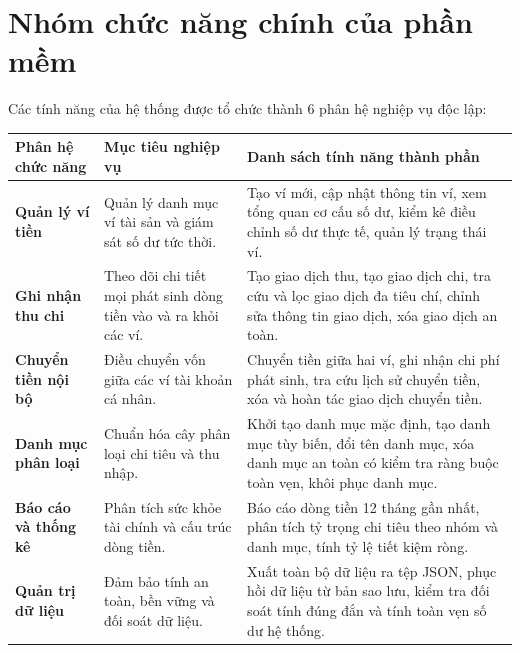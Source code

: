 \documentclass[a4paper,12pt]{report}
\newcounter{none}
\begin{document}
\section{Nhóm chức năng chính của phần
mềm}\label{nhuxf3m-chux1ee9c-nux103ng-chuxednh-cux1ee7a-phux1ea7n-mux1ec1m}

Các tính năng của hệ thống được tổ chức thành 6 phân hệ nghiệp vụ độc
lập:

{\def\LTcaptype{none} %
\begin{longtable}[]{@{}
  >{\raggedright\arraybackslash}p{}
  >{\raggedright\arraybackslash}p{}
  >{\raggedright\arraybackslash}p{}@{}}
\toprule\noalign{}
\begin{minipage}[b]{\linewidth}\raggedright
Phân hệ chức năng
\end{minipage} & \begin{minipage}[b]{\linewidth}\raggedright
Mục tiêu nghiệp vụ
\end{minipage} & \begin{minipage}[b]{\linewidth}\raggedright
Danh sách tính năng thành phần
\end{minipage} \\
\midrule\noalign{}
\endhead
\bottomrule\noalign{}
\endlastfoot
\textbf{Quản lý ví tiền} & Quản lý danh mục ví tài sản và giám sát số dư
tức thời. & Tạo ví mới, cập nhật thông tin ví, xem tổng quan cơ cấu số
dư, kiểm kê điều chỉnh số dư thực tế, quản lý trạng thái ví. \\
\textbf{Ghi nhận thu chi} & Theo dõi chi tiết mọi phát sinh dòng tiền
vào và ra khỏi các ví. & Tạo giao dịch thu, tạo giao dịch chi, tra cứu
và lọc giao dịch đa tiêu chí, chỉnh sửa thông tin giao dịch, xóa giao
dịch an toàn. \\
\textbf{Chuyển tiền nội bộ} & Điều chuyển vốn giữa các ví tài khoản cá
nhân. & Chuyển tiền giữa hai ví, ghi nhận chi phí phát sinh, tra cứu
lịch sử chuyển tiền, xóa và hoàn tác giao dịch chuyển tiền. \\
\textbf{Danh mục phân loại} & Chuẩn hóa cây phân loại chi tiêu và thu
nhập. & Khởi tạo danh mục mặc định, tạo danh mục tùy biến, đổi tên danh
mục, xóa danh mục an toàn có kiểm tra ràng buộc toàn vẹn, khôi phục danh
mục. \\
\textbf{Báo cáo và thống kê} & Phân tích sức khỏe tài chính và cấu trúc
dòng tiền. & Báo cáo dòng tiền 12 tháng gần nhất, phân tích tỷ trọng chi
tiêu theo nhóm và danh mục, tính tỷ lệ tiết kiệm ròng. \\
\textbf{Quản trị dữ liệu} & Đảm bảo tính an toàn, bền vững và đối soát
dữ liệu. & Xuất toàn bộ dữ liệu ra tệp JSON, phục hồi dữ liệu từ bản sao
lưu, kiểm tra đối soát tính đúng đắn và tính toàn vẹn số dư hệ thống. \\
\end{longtable}
}
\end{document}
